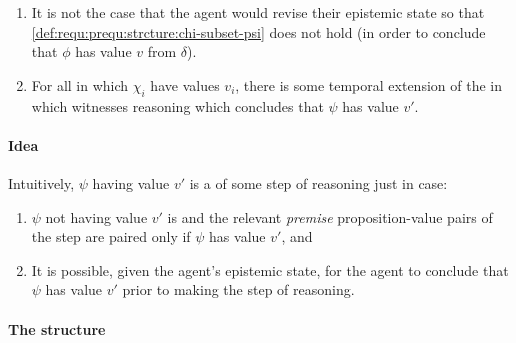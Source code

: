 \begin{definition}
\begin{enumerate}[label=\arabic*., ref=\named{P\(\Re\):\arabic*}]
\begin{enumerate}[label=\alph*., ref=\named{P\(\Re\):1\alph*}]
    \end{enumerate}
  \item
    \label{def:requ:prequ:no-revision}
    It is not the case that the agent would revise their epistemic state so that \ref{def:requ:prequ:strcture:chi-subset-psi} does not hold (in order to conclude that \(\phi\) has value \(v\) from \(\delta\)).
  \item
    \label{def:requ:prequ:possible-reason}
    For all \epVW{} in which \(\chi_{i}\) have values \(v_{i}\), there is some temporal extension of the \world{} in which \vAgent{} witnesses reasoning which concludes that \(\psi\) has value \(v'\).
  \end{enumerate}
\end{definition}

\paragraph{Idea}

\begin{note}
  Intuitively, \(\psi\) having value \(v'\) is a \prequ{} of some step of reasoning just in case:
  \begin{enumerate}[label=\arabic*., ref=(\arabic*)]
  \item
    \label{prequ:int:structure}
    \(\psi\) not having value \(v'\) is \epVAd{} and the relevant \emph{premise} proposition-value pairs of the step are paired only if \(\psi\) has value \(v'\), and
  \item
    \label{prequ:int:reasoning}
    It is possible, given the agent's epistemic state, for the agent to conclude that \(\psi\) has value \(v'\) prior to making the step of reasoning.
  \end{enumerate}
\end{note}

\paragraph{The structure}

